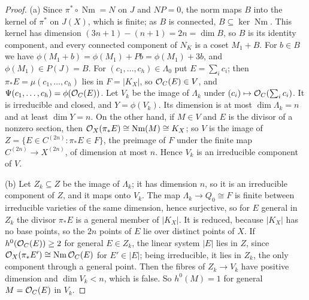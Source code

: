 \begin{proof}
(a) Since $\pi^{*}\circ\operatorname{Nm}=N$ on $J$ and $NP=0$, the norm maps
$B$ into the kernel of $\pi^{*}$ on $J(X)$, which is finite; as $B$ is
connected, $B\subseteq\ker\operatorname{Nm}$. This kernel has dimension
$(3n+1)-(n+1)=2n=\dim B$, so $B$ is its identity component, and every
connected component of $N_{K}$ is a coset $M_{1}+B$. For $b\in B$ we have
$\phi(M_{1}+b)=\phi(M_{1})+Pb=\phi(M_{1})+3b$, and $\phi(M_{1})\in P(J)=B$.
For $(c_{1},\dots,c_{h})\in\Lambda_{0}$ put $E=\sum_{i}c_{i}$; then
$\pi_{*}E=\mu(c_{1},\dots,c_{h})$ lies in $F=|K_{X}|$, so
$\mathcal{O}_{C}(E)\in V$, and $\Psi(c_{1},\dots,c_{h})=\phi(\mathcal{O}_{C}(E))$. Let $V_{k}$
be the image of $\Lambda_{k}$ under $(c_{i})\mapsto\mathcal{O}_{C}(\sum_{i}c_{i})$.
It is irreducible and closed, and $Y=\phi(V_{k})$. Its dimension is at most
$\dim\Lambda_{k}=n$ and at least $\dim Y=n$. On the other hand, if $M\in V$ and
$E$ is the divisor of a nonzero section, then $\mathcal{O}_{X}(\pi_{*}E)\cong
\operatorname{Nm}(M)\cong K_{X}$; so $V$ is the image of
$Z=\{E\in C^{(2n)}:\pi_{*}E\in F\}$, the preimage of $F$ under the finite map
$C^{(2n)}\to X^{(2n)}$, of dimension at most $n$. Hence $V_{k}$ is an
irreducible component of $V$.

(b) Let $Z_{k}\subseteq Z$ be the image of $\Lambda_{k}$; it has dimension
$n$, so it is an irreducible component of $Z$, and it maps onto $V_{k}$. The
map $\Lambda_{k}\to Q_{0}\cong F$ is finite between irreducible varieties of
the same dimension, hence surjective, so for $E$ general in $Z_{k}$ the
divisor $\pi_{*}E$ is a general member of $|K_{X}|$. It is reduced, because
$|K_{X}|$ has no base points, so the $2n$ points of $E$ lie over distinct
points of $X$. If $h^{0}(\mathcal{O}_{C}(E))\ge2$ for general $E\in Z_{k}$, the
linear system $|E|$ lies in $Z$, since $\mathcal{O}_{X}(\pi_{*}E')\cong
\operatorname{Nm}\mathcal{O}_{C}(E)$ for $E'\in|E|$; being irreducible, it lies in
$Z_{k}$, the only component through a general point. Then the fibres of
$Z_{k}\to V_{k}$ have positive dimension and $\dim V_{k}<n$, which is false.
So $h^{0}(M)=1$ for general $M=\mathcal{O}_{C}(E)$ in $V_{k}$.


\end{proof}
